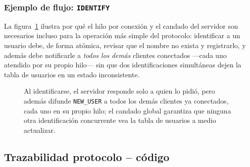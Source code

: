 \documentclass[11pt,letterpaper]{article}
\begin{document}
\subsubsection*{Ejemplo de flujo: \texttt{IDENTIFY}}

La figura~\ref{fig:secuencia-identify} ilustra por qué el hilo por conexión
y el candado del servidor son necesarios incluso para la operación más
simple del protocolo: identificar a un usuario debe, de forma atómica,
revisar que el nombre no exista y registrarlo, y además debe notificarle a
\emph{todos los demás} clientes conectados —cada uno atendido por su propio
hilo— sin que dos identificaciones simultáneas dejen la tabla de usuarios
en un estado inconsistente.

\begin{figure}[H]
\centering
{}
\caption{Al identificarse, el servidor responde solo a quien lo pidió, pero
además difunde \texttt{NEW\_USER} a todos los demás clientes ya conectados,
cada uno en su propio hilo; el candado global garantiza que ninguna otra
identificación concurrente vea la tabla de usuarios a medio actualizar.}
\label{fig:secuencia-identify}
\end{figure}

\subsection{Trazabilidad protocolo -- código}
\end{document}
